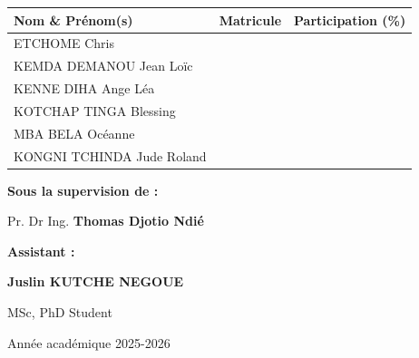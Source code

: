 \documentclass[12pt,a4paper]{report}
\begin{document}
\begin{titlepage}
	\begin{center} 
		\vspace{0.15cm}
		\renewcommand{\arraystretch}{1.15}
		\begin{tabular}{l c c}
			\toprule[0.6pt]
			\textbf{Nom \& Prénom(s)} & \textbf{Matricule} & \textbf{Participation (\%)} \\
			\midrule
			ETCHOME Chris                  & \underline{\hspace{2cm}} & \underline{\hspace{1.2cm}} \\
			KEMDA DEMANOU Jean Loïc        & \underline{\hspace{2cm}} & \underline{\hspace{1.2cm}} \\
			KENNE DIHA Ange Léa            & \underline{\hspace{2cm}} & \underline{\hspace{1.2cm}} \\
			KOTCHAP TINGA Blessing         & \underline{\hspace{2cm}} & \underline{\hspace{1.2cm}} \\
			MBA BELA Océanne               & \underline{\hspace{2cm}} & \underline{\hspace{1.2cm}} \\
			KONGNI TCHINDA Jude Roland     & \underline{\hspace{2cm}} & \underline{\hspace{1.2cm}} \\
			\bottomrule[0.6pt]
		\end{tabular}
	\end{center}
	
	\vspace{0.3cm}
	
	\begin{flushright}
		{ \bfseries \color{MyBlue} \large Sous la supervision de :}
		
		\vspace{0.05cm}
		{  Pr. Dr Ing. \textbf{Thomas Djotio Ndié}}
		
		\vspace{0.2cm}
		
		{  \bfseries \color{MyBlue} Assistant :}
		
		\vspace{0.05cm}
		{ \textbf{Juslin KUTCHE NEGOUE}}
		
		\vspace{0.05cm}
		{\small MSc, PhD Student}
	\end{flushright}
	
	\vfill
	
	\begin{center}
		{\small Année académique 2025-2026} 
	\end{center}
	
	\restoregeometry
	
\end{titlepage}
	
\end{document}
